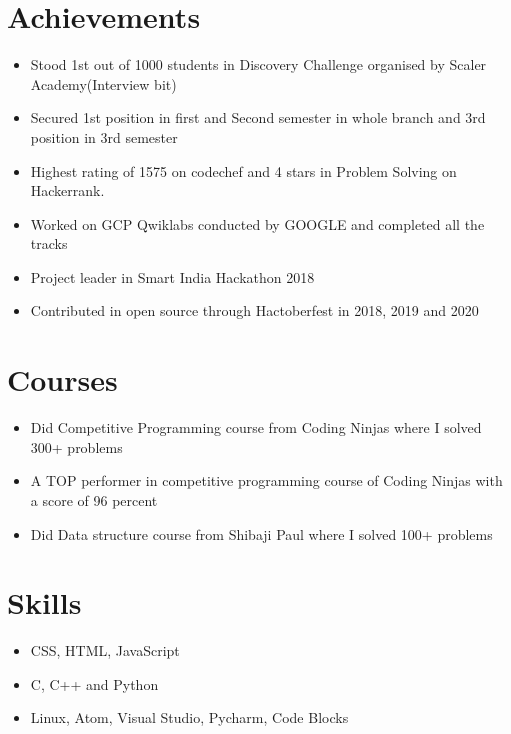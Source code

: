 \documentclass[letterpaper,11pt]{article}
\newcommand{\resumeItem}[1]{
  \item\small{
    {#1 \vspace{-2pt}}
  }
}
\newcommand{\resumeItemListStart}{\begin{itemize}}
\newcommand{\resumeItemListEnd}{\end{itemize}\vspace{-5pt}}
\begin{document}
%
\section{Achievements}
 \begin{itemize}[leftmargin=0.15in, label={}]
            \resumeItemListStart
            \resumeItem{Stood 1st out of 1000 students in Discovery Challenge organised by Scaler Academy(Interview bit)}
            
            \resumeItem{Secured 1st position in first and Second semester in whole branch and 3rd position in 3rd semester}
            
            \resumeItem{Highest rating of 1575 on codechef and 4 stars in Problem Solving on Hackerrank.}
            
            \resumeItem{Worked on GCP Qwiklabs conducted by GOOGLE and completed all the tracks}
            
            \resumeItem{Project leader in Smart India Hackathon 2018}
            
            \resumeItem{Contributed in open source through Hactoberfest in 2018, 2019 and 2020}
            
            
          \resumeItemListEnd
 \end{itemize}

\section{Courses}
 \begin{itemize}[leftmargin=0.15in, label={}]
            \resumeItemListStart
            \resumeItem{Did Competitive Programming course from Coding Ninjas where I solved 300+ problems}
            \resumeItem{A TOP performer in competitive programming course of Coding Ninjas with a  score of 96 percent}
            \resumeItem{Did Data structure course from Shibaji Paul where I solved 100+ problems}
            
          \resumeItemListEnd
 \end{itemize}
 
 \section{Skills}
 \begin{itemize}[leftmargin=0.15in, label={}]
            \resumeItemListStart
            \resumeItem{CSS, HTML, JavaScript}
            \resumeItem{C, C++ and Python}
            \resumeItem{Linux, Atom, Visual Studio, Pycharm, Code Blocks}
          \resumeItemListEnd
 \end{itemize}
 
\end{document}

